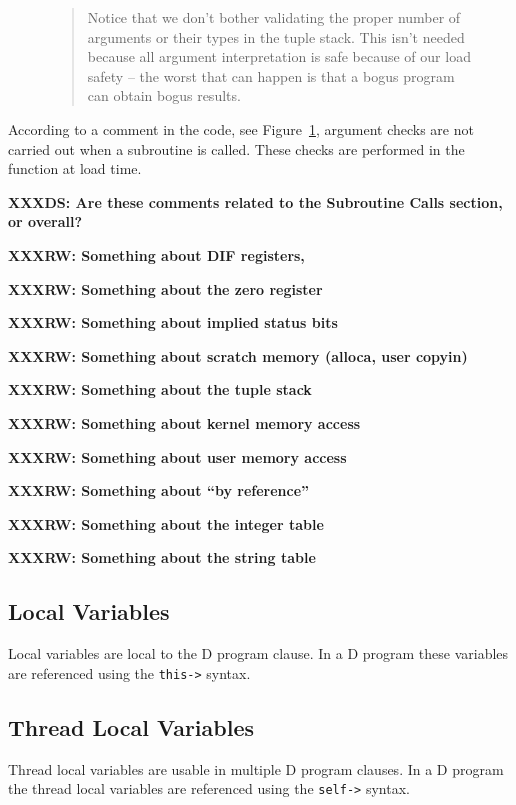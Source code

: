 \begin{figure}
\begin{quote}
  Notice that we don't bother validating the proper number of
  arguments or their types in the tuple stack.  This isn't needed
  because all argument interpretation is safe because of our load
  safety -- the worst that can happen is that a bogus program can
  obtain bogus results.
\end{quote}
\label{fig:argcheck}
\end{figure}

According to a comment in the code, see Figure~\ref{fig:argcheck}, argument
checks are not carried out when a subroutine is called. These checks are
performed in the  function at load time.

\textbf{XXXDS: Are these comments related to the Subroutine Calls section, or
overall?}

\textbf{XXXRW: Something about DIF registers, \nregs{}}

\textbf{XXXRW: Something about the zero register}

\textbf{XXXRW: Something about implied status bits}

\textbf{XXXRW: Something about scratch memory (alloca, user copyin)}

\textbf{XXXRW: Something about the tuple stack}

\textbf{XXXRW: Something about kernel memory access}

\textbf{XXXRW: Something about user memory access}

\textbf{XXXRW: Something about ``by reference''}

\textbf{XXXRW: Something about the integer table}

\textbf{XXXRW: Something about the string table}

\subsection{Local Variables}
\label{sec:local-vars}

Local variables are local to the D program clause.  In a D program
these variables are referenced using the \verb|this->| syntax.  

\subsection{Thread Local Variables}
\label{sec:thread-local-vars}

Thread local variables are usable in multiple D program clauses.  In a
D program the thread local variables are referenced using the
\verb|self->| syntax.

